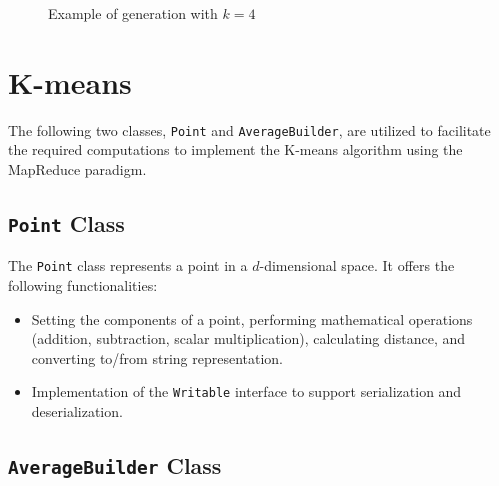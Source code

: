\documentclass[parskip=full]{report}
\begin{document}
\begin{figure}[H]
	\centering
	\caption{Example of generation with $k=4$}
	\label{fig:cluster-example}
\end{figure}

\chapter{K-means}

	The following two classes, \texttt{Point} and \texttt{AverageBuilder}, are utilized to facilitate the required computations to implement the K-means algorithm using the MapReduce paradigm.

	\section{\texttt{Point} Class}

	The \texttt{Point} class represents a point in a $d$-dimensional space. It 
	offers the following functionalities:

	\begin{itemize}
		\item Setting the components of a point, performing mathematical operations (addition, subtraction, scalar multiplication), calculating distance, and converting to/from string representation.
		\item Implementation of the \texttt{Writable} interface to support serialization and deserialization.

	\end{itemize}

	\section{\texttt{AverageBuilder} Class}
\end{document}
